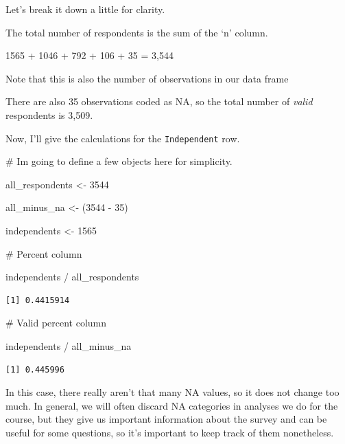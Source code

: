\documentclass[
  letterpaper,
  DIV=11,
  numbers=noendperiod]{scrreprt}
\newenvironment{Shaded}{\begin{snugshade}}{\end{snugshade}}
\newcommand{\CommentTok}[1]{\textcolor[rgb]{0.37,0.37,0.37}{#1}}
\newcommand{\DecValTok}[1]{\textcolor[rgb]{0.68,0.00,0.00}{#1}}
\newcommand{\NormalTok}[1]{\textcolor[rgb]{0.00,0.23,0.31}{#1}}
\newcommand{\OtherTok}[1]{\textcolor[rgb]{0.00,0.23,0.31}{#1}}
\newcommand{\SpecialCharTok}[1]{\textcolor[rgb]{0.37,0.37,0.37}{#1}}
\begin{document}
Let's break it down a little for clarity.

The total number of respondents is the sum of the `n' column.

1565 + 1046 + 792 + 106 + 35 = 3,544

Note that this is also the number of observations in our data frame

There are also 35 observations coded as NA, so the total number of
\emph{valid} respondents is 3,509.

Now, I'll give the calculations for the \texttt{Independent} row.

\begin{Shaded}
\begin{Highlighting}[]
\CommentTok{\# I\textquotesingle{}m going to define a few objects here for simplicity.}

\NormalTok{all\_respondents }\OtherTok{\textless{}{-}} \DecValTok{3544}

\NormalTok{all\_minus\_na }\OtherTok{\textless{}{-}}\NormalTok{ (}\DecValTok{3544} \SpecialCharTok{{-}} \DecValTok{35}\NormalTok{)}

\NormalTok{independents }\OtherTok{\textless{}{-}} \DecValTok{1565}
\end{Highlighting}
\end{Shaded}

\begin{Shaded}
\begin{Highlighting}[]
\CommentTok{\# Percent column}

\NormalTok{independents }\SpecialCharTok{/}\NormalTok{ all\_respondents}
\end{Highlighting}
\end{Shaded}

\begin{verbatim}
[1] 0.4415914
\end{verbatim}

\begin{Shaded}
\begin{Highlighting}[]
\CommentTok{\# Valid percent column}

\NormalTok{independents }\SpecialCharTok{/}\NormalTok{ all\_minus\_na}
\end{Highlighting}
\end{Shaded}

\begin{verbatim}
[1] 0.445996
\end{verbatim}

In this case, there really aren't that many NA values, so it does not
change too much. In general, we will often discard NA categories in
analyses we do for the course, but they give us important information
about the survey and can be useful for some questions, so it's important
to keep track of them nonetheless.
\end{document}
